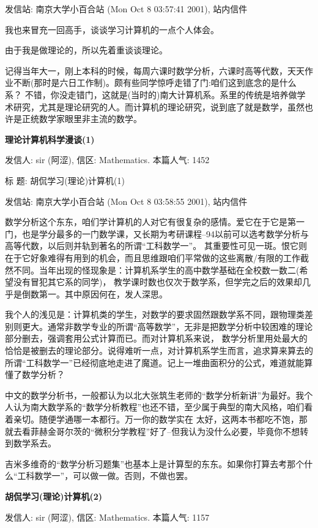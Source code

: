 发信站: 南京大学小百合站 (Mon Oct  8 03:57:41 2001), 站内信件

我也来冒充一回高手，谈谈学习计算机的一点个人体会。

由于我是做理论的，所以先着重谈谈理论。

记得当年大一，刚上本科的时候，每周六课时数学分析，六课时高等代数，天天作业不断(那时是六日工作制)。颇有些同学惊呼走错了门:咱们这到底念的是什么系？
不错，你没走错门，这就是(当时的)南大计算机系。系里的传统是培养做学术研究，尤其是理论研究的人。而计算机的理论研究，说到底了就是数学，虽然也许是正统数学家眼里非主流的数学。


\textbf{理论计算机科学漫谈(1)}

发信人: sir (阿涩), 信区: Mathematics. 本篇人气: 1452

标  题: 胡侃学习(理论)计算机(1)\cite{sir1}

发信站: 南京大学小百合站 (Mon Oct  8 03:58:55 2001), 站内信件



数学分析这个东东，咱们学计算机的人对它有很复杂的感情。爱它在于它是第一门，也是学分最多的一门数学课，又长期为考研课程--94以前可以选考数学分析与高等代数，以后则并轨到著名的所谓“工科数学一”。
其重要性可见一斑。恨它则在于它好象难得有用到的机会，而且思维跟咱们平常做的这些离散/有限的工作截然不同。当年出现的怪现象是：计算机系学生的高中数学基础在全校数一数二(希望没有冒犯其它系的同学)，
教学课时数也仅次于数学系，但学完之后的效果却几乎是倒数第一。其中原因何在，发人深思。

我个人的浅见是：计算机类的学生，对数学的要求固然跟数学系不同，跟物理类差别则更大。通常非数学专业的所谓“高等数学”，无非是把数学分析中较困难的理论部分删去，强调套用公式计算而已。而对计算机系来说，
数学分析里用处最大的恰恰是被删去的理论部分。说得难听一点，对计算机系学生而言，追求算来算去的所谓“工科数学一”已经彻底地走进了魔道。记上一堆曲面积分的公式，难道就能算懂了数学分析？

中文的数学分析书，一般都认为以北大张筑生老师的“数学分析新讲”为最好。我个人认为南大数学系的“数学分析教程”也还不错，至少属于典型的南大风格，咱们看着亲切。随便学通哪一本都行。万一你的数学实在
太好，这两本书都吃不饱，那就去看菲赫金哥尔茨的“微积分学教程”好了--但我认为没什么必要，毕竟你不想转到数学系去。

吉米多维奇的“数学分析习题集”也基本上是计算型的东东。如果你打算去考那个什么“工科数学一”，可以做一做。否则，不做也罢。


\textbf{胡侃学习(理论)计算机(2)}

发信人: sir (阿涩), 信区: Mathematics. 本篇人气: 1157

